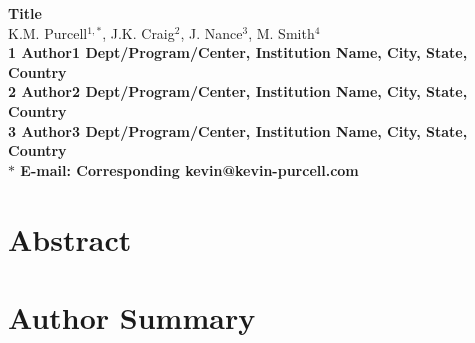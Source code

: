 \documentclass[10pt]{article}
\date{}
\begin{document}
\begin{flushleft}
{\Large
\textbf{Title}
}
\\
K.M. Purcell$^{1,\ast}$, 
J.K. Craig$^{2}$, 
J. Nance$^{3}$,
M. Smith$^{4}$
\\
\bf{1} Author1 Dept/Program/Center, Institution Name, City, State, Country
\\
\bf{2} Author2 Dept/Program/Center, Institution Name, City, State, Country
\\
\bf{3} Author3 Dept/Program/Center, Institution Name, City, State, Country
\\
$\ast$ E-mail: Corresponding kevin@kevin-purcell.com
\end{flushleft}

\section*{Abstract}

\section*{Author Summary}
\end{document}
